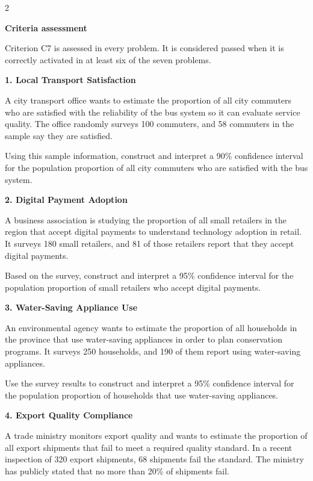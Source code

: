 \documentclass[12pt]{article}
\newcommand{\SubsectionBox}[1]{%
	\noindent\colorbox{gray!30}{%
		\parbox{\linewidth}{\textbf{#1}}%
	}\par\vspace{0.35cm}%
}
\begin{document}
	\begin{multicols}{2}
		\SubsectionBox{Criteria assessment}\vspace{-0.25cm}
		Criterion C7 is assessed in every problem. It is considered passed when it is correctly activated in at least six of the seven problems.
		
		\vspace{0.25cm}
		\SubsectionBox{1. Local Transport Satisfaction}\vspace{-0.25cm}
		A city transport office wants to estimate the proportion of all city commuters who are satisfied with the reliability of the bus system so it can evaluate service quality. The office randomly surveys 100 commuters, and 58 commuters in the sample say they are satisfied.

		Using this sample information, construct and interpret a 90\% confidence interval for the population proportion of all city commuters who are satisfied with the bus system.
		
		\vspace{0.25cm}
		\SubsectionBox{2. Digital Payment Adoption}\vspace{-0.25cm}
		A business association is studying the proportion of all small retailers in the region that accept digital payments to understand technology adoption in retail. It surveys 180 small retailers, and 81 of those retailers report that they accept digital payments.

		Based on the survey, construct and interpret a 95\% confidence interval for the population proportion of small retailers who accept digital payments.
		
		\vspace{0.25cm}
		\SubsectionBox{3. Water-Saving Appliance Use}\vspace{-0.25cm}
		An environmental agency wants to estimate the proportion of all households in the province that use water-saving appliances in order to plan conservation programs. It surveys 250 households, and 190 of them report using water-saving appliances.

		Use the survey results to construct and interpret a 95\% confidence interval for the population proportion of households that use water-saving appliances.
		
		\vspace{0.25cm}
		\SubsectionBox{4. Export Quality Compliance}\vspace{-0.25cm}
		A trade ministry monitors export quality and wants to estimate the proportion of all export shipments that fail to meet a required quality standard. In a recent inspection of 320 export shipments, 68 shipments fail the standard. The ministry has publicly stated that no more than 20\% of shipments fail.


\end{multicols}
\end{document}
